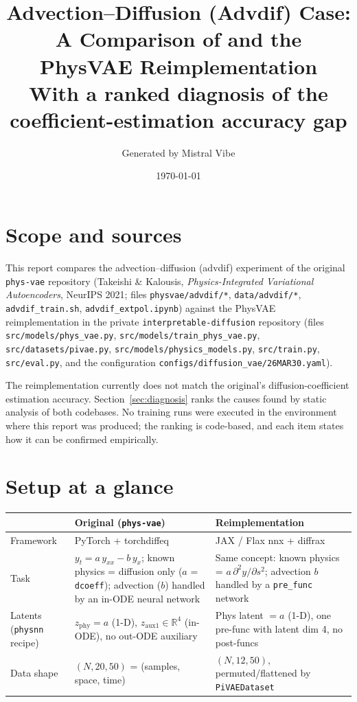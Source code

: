 \documentclass[11pt,a4paper]{article}
\title{Advection--Diffusion (Advdif) Case:\\
A Comparison of \code{phys-vae} and the \code{interpretable-diffusion} PhysVAE Reimplementation\\
\large With a ranked diagnosis of the coefficient-estimation accuracy gap}
\author{Generated by Mistral Vibe}
\date{\today}
\newcommand{\code}[1]{\texttt{#1}}
\begin{document}
\maketitle

\section*{Scope and sources}

This report compares the advection--diffusion (advdif) experiment of the original
\code{phys-vae} repository (Takeishi \& Kalousis, \emph{Physics-Integrated Variational
Autoencoders}, NeurIPS 2021; files \code{physvae/advdif/*}, \code{data/advdif/*},
\code{advdif\_train.sh}, \code{advdif\_extpol.ipynb}) against the PhysVAE
reimplementation in the private \code{interpretable-diffusion} repository
(files \code{src/models/phys\_vae.py}, \code{src/models/train\_phys\_vae.py},
\code{src/datasets/pivae.py}, \code{src/models/physics\_models.py},
\code{src/train.py}, \code{src/eval.py}, and the configuration
\code{configs/diffusion\_vae/26MAR30.yaml}).

The reimplementation currently does not match the original's diffusion-coefficient
estimation accuracy. Section~\ref{sec:diagnosis} ranks the causes found by static
analysis of both codebases. No training runs were executed in the environment where
this report was produced; the ranking is code-based, and each item states how it can
be confirmed empirically.

\section{Setup at a glance}
\label{sec:setup}

\begin{table}[h]
\centering
\small
\begin{tabularx}{\textwidth}{LXX}
\toprule
 & \textbf{Original (\code{phys-vae})} & \textbf{Reimplementation} \\
\midrule
Framework & PyTorch + torchdiffeq & JAX / Flax nnx + diffrax \\
Task & $y_t = a\,y_{xx} - b\,y_x$; known physics = diffusion only ($a$ = \code{dcoeff}); advection ($b$) handled by an in-ODE neural network & Same concept: known physics = $a\,\partial^2 y/\partial s^2$; advection $b$ handled by a \code{pre\_func} network \\
Latents (\code{physnn} recipe) & $z_\mathrm{phy} = a$ (1-D), $z_{\mathrm{aux1}} \in \mathbb{R}^4$ (in-ODE), no out-ODE auxiliary & Phys latent $=a$ (1-D), one pre-func with latent dim 4, no post-funcs \\
Data shape & $(N, 20, 50)$ = (samples, space, time) & $(N, 12, 50)$, permuted/flattened by \code{PiVAEDataset} \\
\bottomrule
\end{tabularx}
\end{table}
\end{document}
